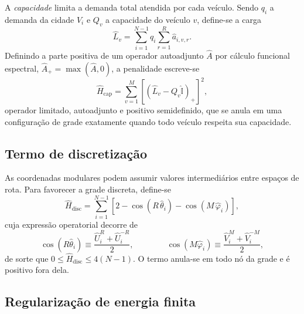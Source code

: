         A \emph{capacidade} limita a demanda total atendida por cada veículo. Sendo $q_i$ a demanda da cidade $V_i$ e $Q_v$ a capacidade do veículo $v$, define-se a carga
        \begin{equation}\label{eq:form_mod_carga}
            \hat{L}_v = \sum_{i=1}^{N-1} q_i \sum_{r=1}^{R} \hat{a}_{i,v,r} .
        \end{equation}
        Definindo a parte positiva de um operador autoadjunto $\hat{A}$ por cálculo funcional espectral, $\hat{A}_+ = \max(\hat{A}, 0)$, a penalidade escreve-se
        \begin{equation}\label{eq:form_mod_hcap}
            \hat{H}_{\text{cap}} = \sum_{v=1}^{M}
            \left[ \left( \hat{L}_v - Q_v \hat{\mathbb{I}} \right)_{+} \right]^{2} ,
        \end{equation}
        \noindent operador limitado, autoadjunto e positivo semidefinido, que se anula em uma configuração de grade exatamente quando todo veículo respeita sua capacidade.

    \subsection{Termo de discretização}\label{subsec:form_mod_disc}

        As coordenadas modulares podem assumir valores intermediários entre espaços de rota. Para favorecer a grade discreta, define-se
        \begin{equation}\label{eq:form_mod_hdisc}
            \hat{H}_{\text{disc}} = \sum_{i=1}^{N-1}
            \left[ 2 - \cos\!\left( R\, \hat{\theta}_i \right)
            - \cos\!\left( M\, \hat{\varphi}_i \right) \right] ,
        \end{equation}
        \noindent cuja expressão operatorial decorre de
        \begin{equation}\label{eq:form_mod_cos}
            \cos\!\left( R\hat{\theta}_i \right) \equiv \frac{\hat{U}_i^{R} + \hat{U}_i^{-R}}{2} ,
            \qquad\qquad
            \cos\!\left( M\hat{\varphi}_i \right) \equiv \frac{\hat{V}_i^{M} + \hat{V}_i^{-M}}{2} ,
        \end{equation}
        \noindent de sorte que $0 \leq \hat{H}_{\text{disc}} \leq 4(N-1)$. O termo anula-se em todo nó da grade e é positivo fora dela.

    \subsection{Regularização de energia finita}\label{subsec:form_mod_regularizacao}

